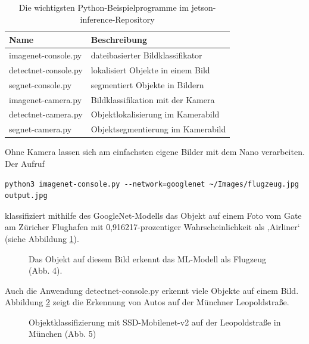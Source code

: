 \begin{table}
	
  \caption{Die wichtigsten Python-Beispielprogramme im jetson-inference-Repository}
  		
  \begin{tabular}{ll}
  	Name                 & Beschreibung  \\ \hline
    imagenet-console.py  & dateibasierter Bildklassifikator  \\
    detectnet-console.py &  lokalisiert Objekte in einem Bild  \\
    segnet-console.py    & segmentiert Objekte in Bildern  \\
    imagenet-camera.py   & Bildklassifikation mit der Kamera  \\
    detectnet-camera.py  & Objektlokalisierung im Kamerabild  \\
    segnet-camera.py     & Objektsegmentierung im Kamerabild  \\
  \end{tabular}
\end{table}

Ohne Kamera lassen sich am einfachsten eigene Bilder mit dem Nano verarbeiten. Der Aufruf 

\begin{lstlisting}
python3 imagenet-console.py --network=googlenet ~/Images/flugzeug.jpg output.jpg
\end{lstlisting}

klassifiziert mithilfe des GoogleNet-Modells das Objekt auf einem Foto vom Gate am Züricher Flughafen mit 0,916217-prozentiger Wahrscheinlichkeit als ‚Airliner‘ (siehe Abbildung \ref{fig:Zwerg:Abb4}). 

\begin{figure}
	
	\caption[Objekterkennung]{Das Objekt auf diesem Bild erkennt das ML-Modell als Flugzeug (Abb. 4).}\label{fig:Zwerg:Abb4}
\end{figure}

Auch die Anwendung detectnet-console.py erkennt viele Objekte auf einem Bild. Abbildung \ref{fig:Zwerg:Abb5} zeigt die Erkennung von Autos auf der Münchner Leopoldstraße. 

\begin{figure}
	
	\caption[Objektklassifizierung mit SSD-Mobilenet-v2]{Objektklassifizierung mit SSD-Mobilenet-v2 auf der Leopoldstraße in München (Abb. 5)}\label{fig:Zwerg:Abb5}
\end{figure}

